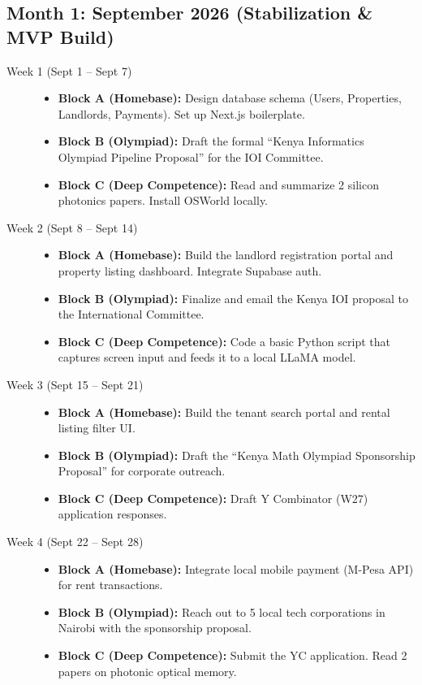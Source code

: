 \documentclass[11pt,a4paper]{article}
\begin{document}
\subsection{Month 1: September 2026 (Stabilization \& MVP Build)}
\begin{description}
    \item[Week 1 (Sept 1 -- Sept 7)] \hfill
    \begin{itemize}
        \item \textbf{Block A (Homebase):} Design database schema (Users, Properties, Landlords, Payments). Set up Next.js boilerplate.
        \item \textbf{Block B (Olympiad):} Draft the formal ``Kenya Informatics Olympiad Pipeline Proposal'' for the IOI Committee.
        \item \textbf{Block C (Deep Competence):} Read and summarize 2 silicon photonics papers. Install OSWorld locally.
    \end{itemize}
    
    \item[Week 2 (Sept 8 -- Sept 14)] \hfill
    \begin{itemize}
        \item \textbf{Block A (Homebase):} Build the landlord registration portal and property listing dashboard. Integrate Supabase auth.
        \item \textbf{Block B (Olympiad):} Finalize and email the Kenya IOI proposal to the International Committee.
        \item \textbf{Block C (Deep Competence):} Code a basic Python script that captures screen input and feeds it to a local LLaMA model.
    \end{itemize}
    
    \item[Week 3 (Sept 15 -- Sept 21)] \hfill
    \begin{itemize}
        \item \textbf{Block A (Homebase):} Build the tenant search portal and rental listing filter UI.
        \item \textbf{Block B (Olympiad):} Draft the ``Kenya Math Olympiad Sponsorship Proposal'' for corporate outreach.
        \item \textbf{Block C (Deep Competence):} Draft Y Combinator (W27) application responses.
    \end{itemize}
    
    \item[Week 4 (Sept 22 -- Sept 28)] \hfill
    \begin{itemize}
        \item \textbf{Block A (Homebase):} Integrate local mobile payment (M-Pesa API) for rent transactions.
        \item \textbf{Block B (Olympiad):} Reach out to 5 local tech corporations in Nairobi with the sponsorship proposal.
        \item \textbf{Block C (Deep Competence):} Submit the YC application. Read 2 papers on photonic optical memory.
    \end{itemize}
\end{description}
\end{document}
